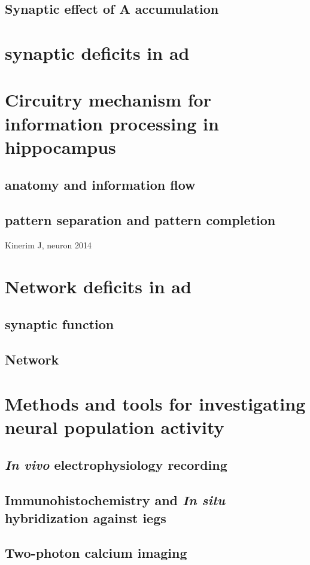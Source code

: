 \subsection{Synaptic effect of A\textbeta{} accumulation}

\section{synaptic deficits in \gls{ad}}

\section{Circuitry mechanism for information processing in hippocampus}
\subsection{anatomy and information flow}
\subsection{pattern separation and pattern completion}
    Kinerim J, neuron 2014

    \section{Network deficits in \gls{ad} \label{network-hypo}}
\subsection{synaptic function}
\subsection{Network}


\section{Methods and tools for investigating neural population activity}
\subsection{\textit{In vivo} electrophysiology recording}
\subsection{Immunohistochemistry and \textit{In situ} hybridization against \glspl{ieg}}
\subsection{Two-photon calcium imaging}
